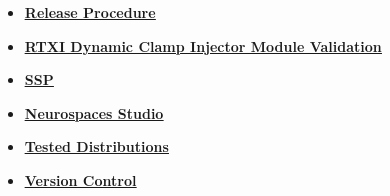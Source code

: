 \documentclass[12pt]{article}
\begin{document}
\begin{itemize}
\item \href{../release-procedure/release-procedure.pdf}{\bf \underline{Release Procedure}}

\item \href{../rtxi-injector-validation/rtxi-injector-validation.pdf}{\bf \underline{RTXI Dynamic Clamp Injector Module Validation}}

\item \href{../ssp/ssp.pdf}{\bf \underline{SSP}}

\item \href{../studio/studio.pdf}{\bf \underline{Neurospaces Studio}}

\item \href{../tested-distributions/tested-distributions.pdf}{\bf \underline{Tested Distributions}}

\item \href{../version-control/version-control.pdf}{\bf \underline{Version Control}}


\end{itemize}

\end{document}
